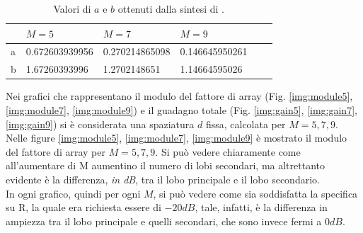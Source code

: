 \begin{table}[h]\footnotesize
\caption{Valori di $a$ e $b$ ottenuti dalla sintesi di \cheby.}
\label{tab:ab}
\begin{tabularx}{\textwidth}{XXXXXX}
\toprule
& $M = 5$ & $M = 7$ & $M = 9$ \\
\midrule
a & 0.672603939956 & 0.270214865098 & 0.146645950261 \\
b & 1.67260393996 & 1.2702148651 & 1.14664595026 \\
\bottomrule
\end{tabularx}
\end{table}

Nei grafici che rappresentano il modulo del fattore di array (Fig. \ref{img:module5}, \ref{img:module7}, \ref{img:module9}) e il guadagno totale (Fig. \ref{img:gain5}, \ref{img:gain7}, \ref{img:gain9}) si è considerata una spaziatura $d$ fissa, calcolata per $M = 5, 7, 9$. \\[1cm]
Nelle figure \ref{img:module5}, \ref{img:module7}, \ref{img:module9} è mostrato il modulo del fattore di array per $M = 5, 7, 9$. Si può vedere chiaramente come all'aumentare di M aumentino il numero di lobi secondari, ma altrettanto evidente è la differenza, \emph{in dB}, tra il lobo principale e il lobo secondario. \\
In ogni grafico, quindi per ogni $M$, si può vedere come sia soddisfatta la specifica su R, la quale era richiesta essere di $-20dB$, tale, infatti, è la differenza in ampiezza tra il lobo principale e quelli secondari, che sono invece fermi a $0dB$. \\[1cm]

